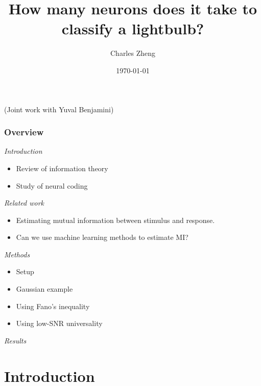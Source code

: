 \documentclass{beamer}
\title[Informal]{How many neurons does it take to classify a lightbulb?}
\author{Charles Zheng} %
\institute[Stanford] %
{Stanford University}
\date{\today} %
\begin{document}
\begin{frame}
\titlepage %
(Joint work with Yuval Benjamini)
\end{frame}

\begin{frame}
\frametitle{Overview}
\noindent\emph{Introduction}
\begin{itemize}
\item Review of information theory
\item Study of neural coding
\end{itemize}
\noindent\emph{Related work}
\begin{itemize}
\item Estimating mutual information between stimulus and response.
\item Can we use machine learning methods to estimate MI?
\end{itemize}
\noindent\emph{Methods}
\begin{itemize}
\item Setup
\item Gaussian example
\item Using Fano's inequality
\item Using low-SNR universality
\end{itemize}
\noindent\emph{Results}
\end{frame}

\section{Introduction}
\end{document}
